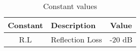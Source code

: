 \documentclass[journal]{IEEEtran}
\begin{document}
\begin{table*}[t]
	
	
	
	
	
	\caption{Constant values}
	\label{1}
	
	\begin{tabular}{|c|c|c|c|}
		\hline 
		Constant & \multicolumn{2}{|l|}{Description} & Value \\ 
		\hline
		R.L & \multicolumn{2}{|l|}{Reflection Loss} &-20 dB \\
		\hline
		

\end{tabular}
\end{table*}
\end{document}
